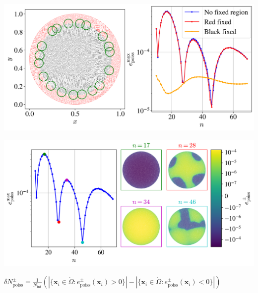 \documentclass{beamer}
\begin{document}
\begin{frame}
\includegraphics[width=.9\linewidth,center]{Figures/BndFixed.png}
\end{frame}
\begin{frame}
\includegraphics[width=.9\linewidth,center]{Figures/PlotWithContours.png}
\end{frame}
\begin{frame}
$\delta N_\mathrm{poiss}^\pm = \frac{1}{N_\mathrm{int}}\left(|\{\textbf{x}_i \in \mathring{\Omega} : e_\mathrm{poiss}^\pm(\textbf{x}_i) > 0 \}| - |\{\textbf{x}_i \in \mathring{\Omega} : e_\mathrm{poiss}^\pm(\textbf{x}_i) < 0 \}| \right)$
\end{frame}
\end{document}
